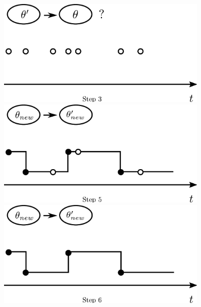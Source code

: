 \begin{figure}[h!]
\begin{minipage}[hp]{0.45\linewidth}
  \end{minipage}
  \begin{minipage}[hp]{0.45\linewidth}
  \centering
    \includegraphics [width=0.90\textwidth, angle=0]{figs/plot3.pdf}
    \vspace{-0 in}
  \end{minipage}
  \begin{minipage}[hp]{0.45\linewidth}
  \centering
    \includegraphics [width=0.90\textwidth, angle=0]{figs/plot5.pdf}
    \vspace{-0 in}
  \end{minipage}
  \begin{minipage}[hp]{0.45\linewidth}
  \centering
    \includegraphics [width=0.90\textwidth, angle=0]{figs/plot6.pdf}

\end{minipage}
\end{figure}
